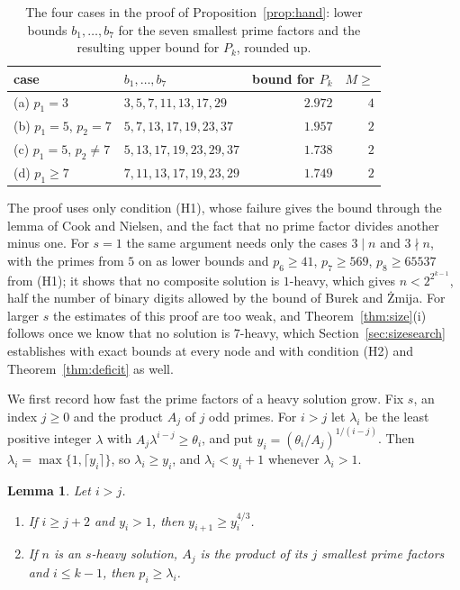 \documentclass[screen,reqno]{aomart}
\numberwithin{equation}{section}
\theoremstyle{plain}
\newtheorem{lemma}[theorem]{Lemma}
\theoremstyle{definition}
\theoremstyle{remark}
\begin{document}
\begin{table}[ht]
\centering
\caption{The four cases in the proof of Proposition~\ref{prop:hand}:
lower bounds $b_1,\dots,b_7$ for the seven smallest prime factors and
the resulting upper bound for $P_k$, rounded up.}
\label{tab:hand}
\smallskip
\small
\begin{tabular}{@{}llrr@{}}
\toprule
case & $b_1,\dots,b_7$ & bound for $P_k$ & $M\ge$ \\
\midrule
(a) $p_1=3$ & $3,5,7,11,13,17,29$ & $2.972$ & $4$ \\
(b) $p_1=5$, $p_2=7$ & $5,7,13,17,19,23,37$ & $1.957$ & $2$ \\
(c) $p_1=5$, $p_2\ne7$ & $5,13,17,19,23,29,37$ & $1.738$ & $2$ \\
(d) $p_1\ge7$ & $7,11,13,17,19,23,29$ & $1.749$ & $2$ \\
\bottomrule
\end{tabular}
\end{table}

The proof uses only condition (H1), whose failure gives the bound
through the lemma of Cook and Nielsen, and the fact that no prime
factor divides another minus one.
For $s=1$ the same argument needs only the cases $3\mid n$ and
$3\nmid n$, with the primes from $5$ on as lower bounds and
$p_6\ge41$, $p_7\ge569$, $p_8\ge65537$ from (H1); it shows that no
composite solution is $1$-heavy, which gives $n<2^{2^{k-1}}$, half the
number of binary digits allowed by the bound of Burek and \.Zmija. For larger $s$ the estimates of this proof
are too weak, and Theorem~\ref{thm:size}(i) follows once we know that
no solution is $7$-heavy, which Section~\ref{sec:sizesearch}
establishes with exact bounds at every node and with condition (H2)
and Theorem~\ref{thm:deficit} as well.

We first record how fast the prime factors of a heavy solution grow.
Fix $s$, an index $j\ge0$ and the product $A_j$ of $j$ odd primes. For
$i>j$ let $\lambda_i$ be the least positive integer $\lambda$ with
$A_j\lambda^{i-j}\ge\theta_i$, and put $y_i=(\theta_i/A_j)^{1/(i-j)}$.
Then $\lambda_i=\max\{1,\lceil y_i\rceil\}$, so $\lambda_i\ge y_i$,
and $\lambda_i<y_i+1$ whenever $\lambda_i>1$.

\begin{lemma}\label{lem:growth}
Let $i>j$.
\begin{enumerate}[label=\textup{(\roman*)}]
\item If $i\ge j+2$ and $y_i>1$, then $y_{i+1}\ge y_i^{4/3}$.
\item If $n$ is an $s$-heavy solution, $A_j$ is the product of its $j$
smallest prime factors and $i\le k-1$, then $p_i\ge\lambda_i$.
\end{enumerate}
\end{lemma}
\end{document}
